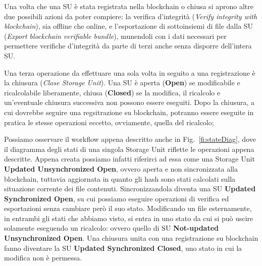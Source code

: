 Una volta che una SU è stata registrata nella blockchain o chiusa si aprono altre
due possibili azioni da poter compiere: la verifica d'integrità (\emph{Verify integrity with blockchain}),
sia offline che online, e l'esportazione di sottoinsiemi di file dalla SU (\emph{Export blockchain verifiable bundle}),
munendoli con i dati necessari per permettere verifiche d'integrità da parte di terzi
anche senza disporre dell'intera SU.

Una terza operazione da effettuare una sola volta in seguito a una registrazione è la chiusura
(\emph{Close Storage Unit}).
Una SU è aperta (\textbf{Open}) se modificabile e ricalcolabile liberamente,
chiusa (\textbf{Closed}) se la modifica, il ricalcolo e un'eventuale chiusura
successiva non possono essere eseguiti. Dopo la chiusura, a cui dovrebbe
seguire una regsitrazione su blockchain, potranno essere eseguite
in pratica le stesse operazioni eccetto, ovviamente, quella del ricalcolo;

Possiamo osservare il workflow appena descritto anche in Fig.~\ref{fi:stateDiag}, dove il diagramma degli
stati di una singola Storage Unit riflette le operazioni appena descritte.
Appena creata possiamo infatti riferirci ad essa come una Storage Unit \textbf{Updated Unsynchronized Open},
ovvero aperta e non sincronizzata alla blockchain, tuttavia aggiornata in quanto gli hash sono stati calcolati
sulla situazione corrente dei file contenuti. Sincronizzandola diventa una SU \textbf{Updated Synchronized Open},
su cui possiamo eseguire operazioni di verifica ed esportazioni senza cambiare però il suo stato.
Modificando un file esternamente, in entrambi gli stati che abbiamo visto, si entra in uno stato da cui si
può uscire solamente eseguendo un ricalcolo: ovvero quello di SU \textbf{Not-updated Unsynchronized Open}.
Una chiusura unita con una registrazione su blockchain fanno diventare la SU
\textbf{Updated Synchronized Closed}, uno stato in cui la modifica non è permessa.


